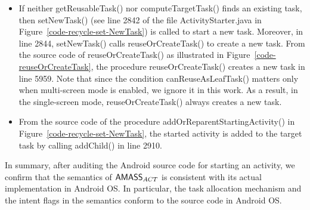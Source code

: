 \begin{itemize}
%
\item If neither getReusableTask() nor computeTargetTask() finds an existing task, then setNewTask() (see line 2842 of the file ActivityStarter.java in Figure~\ref{code-recycle-set-NewTask}) is called to start a new task.  Moreover, in line 2844, setNewTask() calls reuseOrCreateTask() to create a new task. From the source code of reuseOrCreateTask() as illustrated in Figure~\ref{code-reuseOrCreateTask}, the procedure reuseOrCreateTask() creates a new task in line 5959. Note that since the condition canReuseAsLeafTask() matters only when multi-screen mode is enabled, we ignore it in this work. As a result, in the single-screen mode, reuseOrCreateTask() always creates a new task. 
%
\item From the source code of the procedure addOrReparentStartingActivity() in Figure~\ref{code-recycle-set-NewTask}, the started activity is added to the target task by calling addChild() in line 2910. 
\end{itemize}

In summary, after auditing the Android source code for starting an activity, we confirm that the semantics of $\textsf{AMASS}_{ACT}$ is consistent with its actual implementation in Android OS. In particular, the task allocation mechanism and the intent flags in the semantics conform to the source code in Android OS. 


